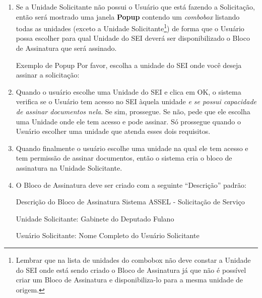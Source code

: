 	
	\begin{enumerate}

	
	\item  Se a Unidade Solicitante não possui o Usuário que está fazendo a Solicitação, então será mostrado uma janela \textbf{Popup} contendo um \emph{combobox} listando todas as unidades (exceto a Unidade Solicitante\footnote{Lembrar  que na lista de unidades do combobox não deve constar a Unidade do SEI onde está sendo criado o Bloco de Assinatura já que não é possível criar um Bloco de Assinatura e disponibiliza-lo para a mesma unidade de origem.}) de forma que o Usuário possa escolher para qual Unidade do SEI deverá ser disponibilizado o Bloco de Assinatura que será assinado.

	\begin{env-popup}[1]{Exemplo de Popup}
	Por favor, escolha a unidade do SEI onde você deseja assinar a solicitação:
	
	\vphantom{espaço vertical em branco}			
	
	\framebox[0.5cm][c]{$\nabla$}
	
	\vphantom{espaço vertical em branco}					
	
	
	
	\end{env-popup}	

	\item Quando o usuário escolhe uma Unidade do SEI e clica em OK, o sistema verifica se o Usuário tem acesso no SEI àquela unidade \emph{e se possui capacidade de assinar documentos nela}. Se sim, prossegue. Se não, pede que ele escolha uma Unidade onde ele tem acesso e pode assinar. Só prossegue quando o Usuário escolher uma unidade que atenda esses dois requisitos. 	


	\item Quando finalmente o usuário escolhe uma unidade na qual ele tem acesso e tem permissão de assinar documentos, então o sistema cria o bloco de assinatura na Unidade Solicitante.
	
	\item O Bloco de Assinatura deve ser criado com a seguinte ``Descrição'' padrão:
	
	\begin{exemplo}[1]{Descrição do Bloco de Assinatura}
		Sistema ASSEL - Solicitação de Serviço

		Unidade Solicitante: Gabinete do Deputado Fulano

		Usuário Solicitante: Nome Completo do Usuário Solicitante
	\end{exemplo}
	

\end{enumerate}
